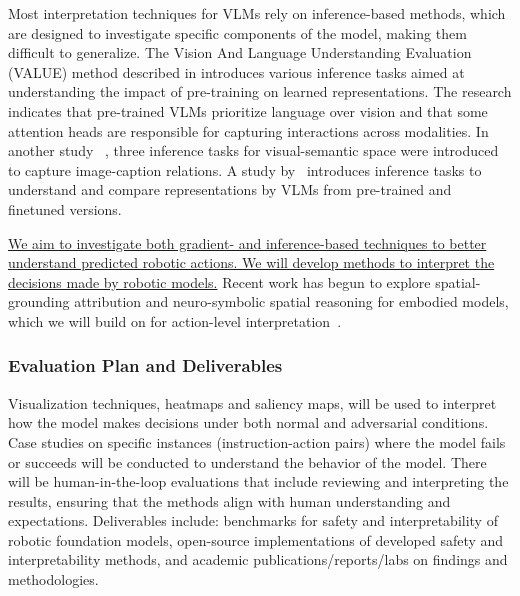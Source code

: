 Most interpretation techniques for VLMs rely on inference-based methods, which are designed to investigate specific components of the model, making them difficult to generalize. 
The Vision And Language Understanding Evaluation (VALUE) method described in \cite{cao2020behind} introduces various inference tasks aimed at understanding the impact of pre-training on learned representations.
The research indicates that pre-trained VLMs prioritize language over vision and that some attention heads are responsible for capturing interactions across modalities.
In another study~
\cite{dahlgren-lindstrom-etal-2020-probing}, three inference tasks for visual-semantic space were introduced to capture image-caption relations.
A study by~\cite{DBLP:conf/aaai/SalinFAF22} introduces inference tasks to understand and compare representations by VLMs from pre-trained and finetuned versions. 




\ul{We aim to investigate both gradient- and inference-based techniques to better understand predicted robotic actions. We will develop methods to interpret the decisions made by robotic models.}
Recent work has begun to explore spatial-grounding attribution and neuro-symbolic spatial reasoning for embodied models, which we will build on for action-level interpretation~\cite{schofield2026chain,jahangard2025multimodal}.


\subsubsection{Evaluation Plan and Deliverables} \label{sec:t3_evaluation}
Visualization techniques, \eg heatmaps and saliency maps, will be used to interpret how the model makes decisions under both normal and adversarial conditions.
Case studies on specific instances (\ie instruction-action pairs) where the model fails or succeeds will be conducted to understand the behavior of the model.
There will be human-in-the-loop evaluations that include reviewing and interpreting the results, ensuring that the methods align with human understanding and expectations.
Deliverables include:  benchmarks for safety and interpretability of robotic foundation models,  open-source implementations of developed safety and interpretability methods, and  academic publications/reports/labs on findings and methodologies.


